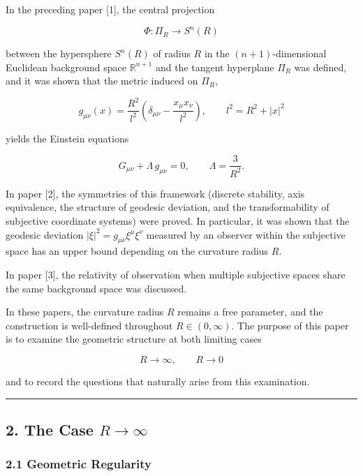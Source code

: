 \documentclass[a4paper,11pt]{article}
\theoremstyle{definition}
\begin{document}
In the preceding paper {[}1{]}, the central projection

\[
\Phi : \Pi_R \longrightarrow S^n(R)
\]

between the hypersphere \(S^n(R)\) of radius \(R\) in the \((n+1)\)-dimensional Euclidean background space \(\mathbb{R}^{n+1}\) and the tangent hyperplane \(\Pi_R\) was defined, and it was shown that the metric induced on \(\Pi_R\),

\[
g_{\mu\nu}(x) = \frac{R^2}{l^2}\left(\delta_{\mu\nu} - \frac{x_\mu x_\nu}{l^2}\right), \qquad l^2 = R^2 + |x|^2
\]

yields the Einstein equations

\[
G_{\mu\nu} + \Lambda\, g_{\mu\nu} = 0, \qquad \Lambda = \frac{3}{R^2}.
\]

In paper {[}2{]}, the symmetries of this framework (discrete stability, axis equivalence, the structure of geodesic deviation, and the transformability of subjective coordinate systems) were proved. In particular, it was shown that the geodesic deviation \(|\xi|^2 = g_{\mu\nu}\xi^\mu \xi^\nu\) measured by an observer within the subjective space has an upper bound depending on the curvature radius \(R\).

In paper {[}3{]}, the relativity of observation when multiple subjective spaces share the same background space was discussed.

In these papers, the curvature radius \(R\) remains a free parameter, and the construction is well-defined throughout \(R \in (0, \infty)\). The purpose of this paper is to examine the geometric structure at both limiting cases

\[
R \to \infty, \qquad R \to 0
\]

and to record the questions that naturally arise from this examination.

\begin{center}\rule{0.5\linewidth}{0.5pt}\end{center}

\subsection{\texorpdfstring{2. The Case \(R \to \infty\)}{2. The Case R \textbackslash to \textbackslash infty}}\label{the-case-r-to-infty}

\subsubsection{2.1 Geometric Regularity}\label{geometric-regularity}
\end{document}
